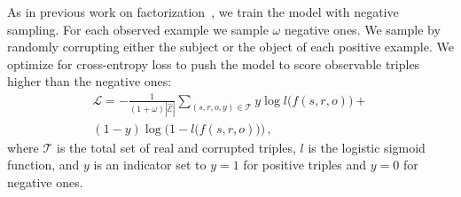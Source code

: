 As in  previous work on factorization~\cite{distmult-embedding_entities_and_relations,complex-complex_embeddings_for_simple_link_prediction}, we train the model with negative sampling. For each observed example we sample $\omega$ negative ones. We sample by randomly corrupting either the subject or the object of each positive example.
We optimize for cross-entropy loss to push the model to score observable triples higher than the negative ones:
\begin{equation}
\begin{split}
\mathcal{L} = - \frac{1}{ (1+\omega) |\mathcal{\hat{E}}|}\sum\limits_{(s,r,o,y) \in \mathcal{T}} y \log l\bigl(f(s,r,o)\bigr) + \\
(1-y) \log\bigl(1-l\bigl(f(s,r,o)\bigr)\bigr) \, ,
\end{split}
\end{equation}
where $\mathcal{T}$ is the total set of real and corrupted triples, $l$ is the logistic sigmoid function, and $y$ is an indicator set to $y=1$ for positive triples and $y=0$ for negative ones.
